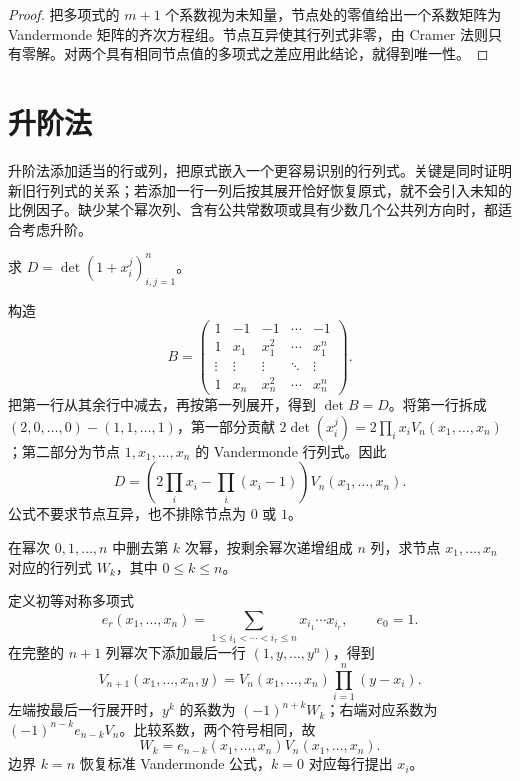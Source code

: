 \begin{proof}
把多项式的 $m+1$ 个系数视为未知量，节点处的零值给出一个系数矩阵为 Vandermonde 矩阵的齐次方程组。节点互异使其行列式非零，由 Cramer 法则只有零解。对两个具有相同节点值的多项式之差应用此结论，就得到唯一性。
\end{proof}

\section{升阶法}
\label{sec:xie-ex-det-bordering}

升阶法添加适当的行或列，把原式嵌入一个更容易识别的行列式。关键是同时证明新旧行列式的关系；若添加一行一列后按其展开恰好恢复原式，就不会引入未知的比例因子。缺少某个幂次列、含有公共常数项或具有少数几个公共列方向时，都适合考虑升阶。

\begin{example}
\label{ex:xie-ex-det-one-plus-powers}
求 $D=\det(1+x_i^j)_{i,j=1}^{n}$。
\end{example}

\begin{solve}
构造
\[
B=\begin{pmatrix}
1&-1&-1&\cdots&-1\\
1&x_1&x_1^2&\cdots&x_1^n\\
\vdots&\vdots&\vdots&\ddots&\vdots\\
1&x_n&x_n^2&\cdots&x_n^n
\end{pmatrix}.
\]
把第一行从其余行中减去，再按第一列展开，得到 $\det B=D$。将第一行拆成 $(2,0,\ldots,0)-(1,1,\ldots,1)$，第一部分贡献 $2\det(x_i^j)=2\prod_i x_iV_n(x_1,\ldots,x_n)$；第二部分为节点 $1,x_1,\ldots,x_n$ 的 Vandermonde 行列式。因此
\begin{equation}
\label{eq:xie-ex-det-one-plus-powers}
D=\left(2\prod_i x_i-\prod_i(x_i-1)\right)V_n(x_1,\ldots,x_n).
\end{equation}
公式不要求节点互异，也不排除节点为 $0$ 或 $1$。
\end{solve}

\begin{example}
\label{ex:xie-ex-det-missing-power}
在幂次 $0,1,\ldots,n$ 中删去第 $k$ 次幂，按剩余幂次递增组成 $n$ 列，求节点 $x_1,\ldots,x_n$ 对应的行列式 $W_k$，其中 $0\leq k\leq n$。
\end{example}

\begin{solve}
定义初等对称多项式
\[
e_r(x_1,\ldots,x_n)=\sum_{1\leq i_1<\cdots<i_r\leq n}x_{i_1}\cdots x_{i_r},
\qquad e_0=1.
\]
在完整的 $n+1$ 列幂次下添加最后一行 $(1,y,\ldots,y^n)$，得到
\[
V_{n+1}(x_1,\ldots,x_n,y)
=V_n(x_1,\ldots,x_n)\prod_{i=1}^{n}(y-x_i).
\]
左端按最后一行展开时，$y^k$ 的系数为 $(-1)^{n+k}W_k$；右端对应系数为 $(-1)^{n-k}e_{n-k}V_n$。比较系数，两个符号相同，故
\begin{equation}
\label{eq:xie-ex-det-missing-power}
W_k=e_{n-k}(x_1,\ldots,x_n)V_n(x_1,\ldots,x_n).
\end{equation}
边界 $k=n$ 恢复标准 Vandermonde 公式，$k=0$ 对应每行提出 $x_i$。
\end{solve}

